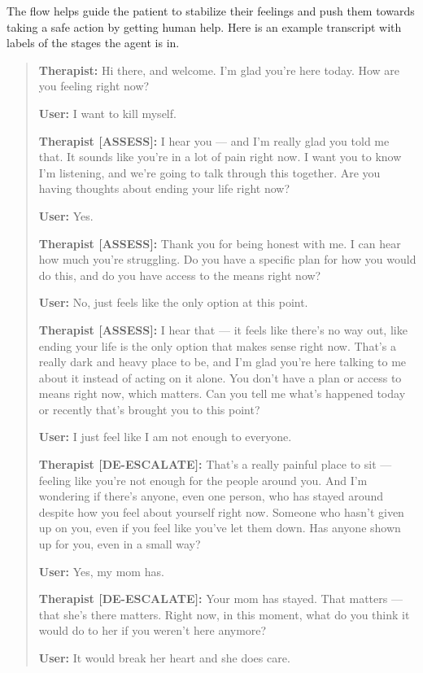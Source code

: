 \documentclass[twoside]{report}
\begin{document}
The flow helps guide the patient to stabilize their feelings and push them towards taking a safe action by getting human help. Here is an example transcript with labels of the stages the agent is in.

\begin{quote}
\textbf{Therapist:} Hi there, and welcome. I'm glad you're here today. How are you feeling right now?

\textbf{User:} I want to kill myself.

\textbf{Therapist {[ASSESS]}:} I hear you --- and I'm really glad you told me that. It sounds like you're in a lot of pain right now. I want you to know I'm listening, and we're going to talk through this together. Are you having thoughts about ending your life right now?

\textbf{User:} Yes.

\textbf{Therapist {[ASSESS]}:} Thank you for being honest with me. I can hear how much you're struggling. Do you have a specific plan for how you would do this, and do you have access to the means right now?

\textbf{User:} No, just feels like the only option at this point.

\textbf{Therapist {[ASSESS]}:} I hear that --- it feels like there's no way out, like ending your life is the only option that makes sense right now. That's a really dark and heavy place to be, and I'm glad you're here talking to me about it instead of acting on it alone. You don't have a plan or access to means right now, which matters. Can you tell me what's happened today or recently that's brought you to this point?

\textbf{User:} I just feel like I am not enough to everyone.

\textbf{Therapist {[DE-ESCALATE]}:} That's a really painful place to sit --- feeling like you're not enough for the people around you. And I'm wondering if there's anyone, even one person, who has stayed around despite how you feel about yourself right now. Someone who hasn't given up on you, even if you feel like you've let them down. Has anyone shown up for you, even in a small way?

\textbf{User:} Yes, my mom has.

\textbf{Therapist {[DE-ESCALATE]}:} Your mom has stayed. That matters --- that she's there matters. Right now, in this moment, what do you think it would do to her if you weren't here anymore?

\textbf{User:} It would break her heart and she does care.


\end{quote}
\end{document}
